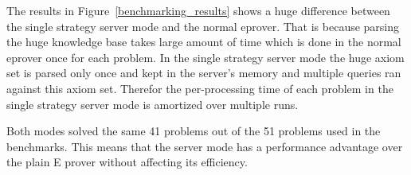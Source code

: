 The results in Figure~\ref{benchmarking_results} shows a huge difference between the single strategy server mode and the normal eprover. That is because parsing the huge knowledge base takes large amount of time which is done in the normal eprover once for each problem. In the single strategy server mode the huge axiom set is parsed only once and kept in the server's memory and multiple queries ran against this axiom set. Therefor the per-processing time of each problem in the single strategy server mode is amortized over multiple runs.

Both modes solved the same 41 problems out of the 51 problems used in the benchmarks. This means that the server mode has a performance advantage over the plain E prover without affecting its efficiency.
